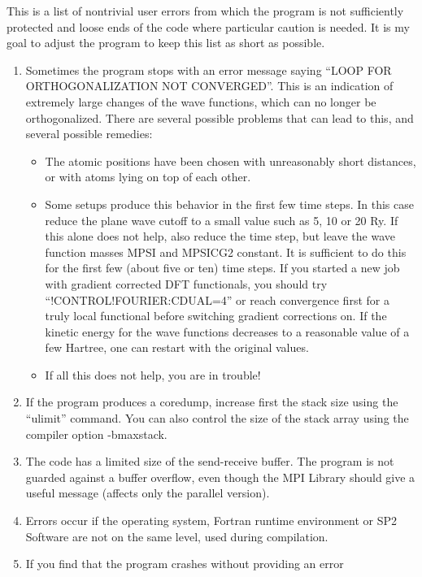 \documentclass[final,12pt]{article}
\begin{document}
{{{{{{This is a list of nontrivial user errors from which the program is not
sufficiently protected and loose ends of the code where particular
caution is needed. It is my goal to adjust the program to
keep this list as short as possible.

\begin{enumerate}
\item Sometimes the program stops with an error message saying 
  ``LOOP FOR ORTHOGONALIZATION NOT CONVERGED''. This is an indication
  of extremely large changes of the wave functions, which can no
  longer be orthogonalized. There are several possible problems that can
  lead to this, and several possible remedies: 
  \begin{itemize}
  \item The atomic positions have been chosen with unreasonably short
    distances, or with atoms lying on top of each other.
  \item Some setups produce this behavior in the first few time steps.
    In this case reduce the plane wave cutoff to a small value such as
    5, 10 or 20 Ry. If this alone does not help, also reduce the time
    step, but leave the wave function masses MPSI and MPSICG2
    constant. It is sufficient to do this for the first few (about five
    or ten) time steps. If you started a new job with gradient
    corrected DFT functionals, you should try
    ``!CONTROL!FOURIER:CDUAL=4'' or reach convergence first for a
    truly local functional before switching gradient corrections
    on. If the kinetic energy for the wave functions decreases to a
    reasonable value of a few Hartree, one can restart with the
    original values.
  \item If all this does not help, you are in trouble!
  \end{itemize}
\item If the program produces a coredump, increase first the stack size
  using the ``ulimit'' command. You can also control the size of the stack
  array using the compiler option -bmaxstack.
\item The code has a limited size of the send-receive buffer. The
  program is not guarded against a buffer overflow, even though the MPI
  Library should give a useful message (affects only the parallel
  version).
\item Errors occur if the operating system, Fortran runtime
  environment or SP2 Software are not on the same level, 
  used during compilation.
\item If you find that the program crashes without providing an error

\end{enumerate}}}}}}}
\end{document}
